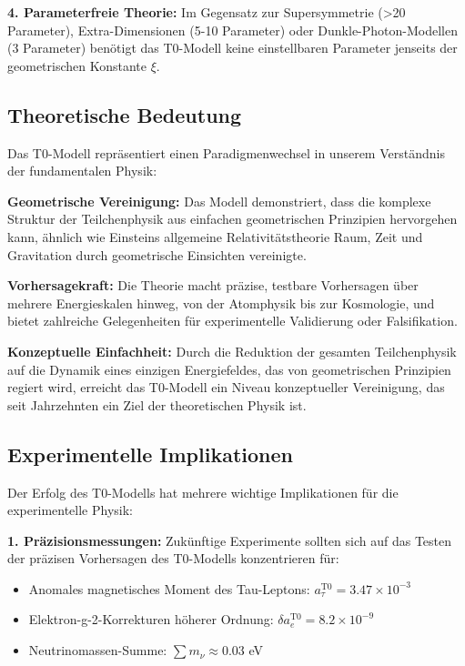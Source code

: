 \documentclass[12pt,a4paper]{article}
\newcommand{\xigeom}{\xi}
\begin{document}
\textbf{4. Parameterfreie Theorie:}
Im Gegensatz zur Supersymmetrie (>20 Parameter), Extra-Dimensionen (5-10 Parameter) oder Dunkle-Photon-Modellen (3 Parameter) benötigt das T0-Modell keine einstellbaren Parameter jenseits der geometrischen Konstante $\xigeom$.

\subsection{Theoretische Bedeutung}

Das T0-Modell repräsentiert einen Paradigmenwechsel in unserem Verständnis der fundamentalen Physik:

\textbf{Geometrische Vereinigung:}
Das Modell demonstriert, dass die komplexe Struktur der Teilchenphysik aus einfachen geometrischen Prinzipien hervorgehen kann, ähnlich wie Einsteins allgemeine Relativitätstheorie Raum, Zeit und Gravitation durch geometrische Einsichten vereinigte.

\textbf{Vorhersagekraft:}
Die Theorie macht präzise, testbare Vorhersagen über mehrere Energieskalen hinweg, von der Atomphysik bis zur Kosmologie, und bietet zahlreiche Gelegenheiten für experimentelle Validierung oder Falsifikation.

\textbf{Konzeptuelle Einfachheit:}
Durch die Reduktion der gesamten Teilchenphysik auf die Dynamik eines einzigen Energiefeldes, das von geometrischen Prinzipien regiert wird, erreicht das T0-Modell ein Niveau konzeptueller Vereinigung, das seit Jahrzehnten ein Ziel der theoretischen Physik ist.

\subsection{Experimentelle Implikationen}

Der Erfolg des T0-Modells hat mehrere wichtige Implikationen für die experimentelle Physik:

\textbf{1. Präzisionsmessungen:}
Zukünftige Experimente sollten sich auf das Testen der präzisen Vorhersagen des T0-Modells konzentrieren für:
\begin{itemize}
\item Anomales magnetisches Moment des Tau-Leptons: $a_\tau^{\text{T0}} = 3.47 \times 10^{-3}$
\item Elektron-g-2-Korrekturen höherer Ordnung: $\delta a_e^{\text{T0}} = 8.2 \times 10^{-9}$
\item Neutrinomassen-Summe: $\sum m_\nu \approx 0.03$ eV
\end{itemize}
\end{document}
